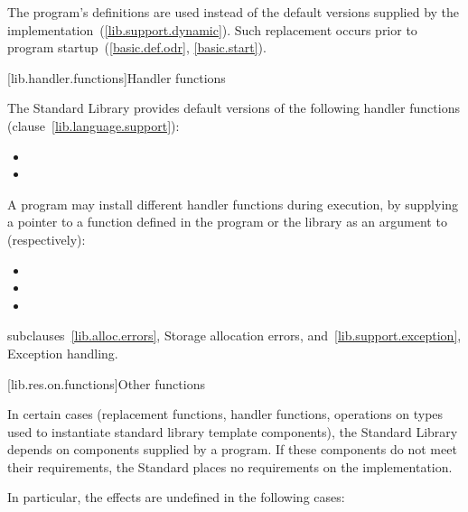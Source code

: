 \pnum
The program's definitions are used instead of the default versions supplied by
the implementation~(\ref{lib.support.dynamic}).
Such replacement occurs prior to program startup~(\ref{basic.def.odr}, \ref{basic.start}).

[lib.handler.functions]{Handler functions}

\pnum
The \Cpp Standard Library provides default versions of the following handler
functions (clause~\ref{lib.language.support}):

\begin{itemize}
\item
{}
%
\item
{}
%
\end{itemize}

\pnum
A \Cpp program may install different handler functions during execution, by
supplying a pointer to a function defined in the program or the library
as an argument to (respectively):

\begin{itemize}
\item
{}%
\item
{}%
\item
{}
\end{itemize}

\xref
subclauses~\ref{lib.alloc.errors}, Storage allocation errors, and~\ref{lib.support.exception}, 
Exception handling.

[lib.res.on.functions]{Other functions}

\pnum
In certain cases (replacement functions, handler functions, operations on types used to
instantiate standard library template components), the \Cpp Standard Library depends on
components supplied by a \Cpp program.
If these components do not meet their requirements, the Standard places no requirements
on the implementation.

\pnum
In particular, the effects are undefined in the following cases:

